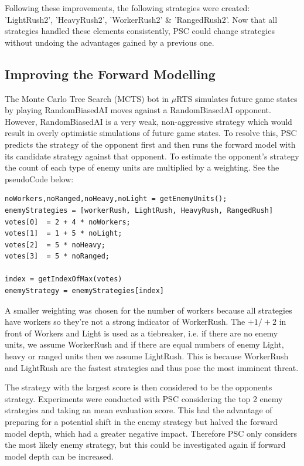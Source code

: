 \documentclass[]{article}
\begin{document}
Following these improvements, the following strategies were created: 'LightRush2', 'HeavyRush2', 'WorkerRush2' \& 'RangedRush2'. Now that all strategies handled these elements consistently, PSC could change strategies without undoing the advantages gained by a previous one.

\subsection{Improving the Forward Modelling}
The Monte Carlo Tree Search (MCTS) \cite{abramson2014expected} bot in $\mu$RTS simulates future game states by playing RandomBiasedAI moves against a RandomBiasedAI opponent. However, RandomBiasedAI is a very weak, non-aggressive strategy which would result in overly optimistic simulations of future game states.  To resolve this, PSC predicts the strategy of the opponent first and then runs the forward model with its candidate strategy against that opponent. To estimate the opponent's strategy the count of each type of enemy units are multiplied by a weighting. See the pseudoCode below:

\begin{lstlisting}
noWorkers,noRanged,noHeavy,noLight = getEnemyUnits();
enemyStrategies = [workerRush, LightRush, HeavyRush, RangedRush]
votes[0]  = 2 + 4 * noWorkers;
votes[1]  = 1 + 5 * noLight; 
votes[2]  = 5 * noHeavy;
votes[3]  = 5 * noRanged;

index = getIndexOfMax(votes)
enemyStrategy = enemyStrategies[index]
\end{lstlisting}

A smaller weighting was chosen for the number of workers because all strategies have workers so they're not a strong indicator of WorkerRush. The $+1/+2$ in front of Workers and Light is used as a tiebreaker, i.e. if there are no enemy units, we assume WorkerRush and if there are equal numbers of enemy Light, heavy or ranged units then we assume LightRush. This is because WorkerRush and LightRush are the fastest strategies and thus pose the most imminent threat.

The strategy with the largest score is then considered to be the opponents strategy. Experiments were conducted with PSC considering the top 2 enemy strategies and taking an mean evaluation score. This had the advantage of preparing for a potential shift in the enemy strategy but halved the forward model depth, which had a greater negative impact. Therefore PSC only considers the most likely enemy strategy, but this could be investigated again if forward model depth can be increased.
\end{document}
